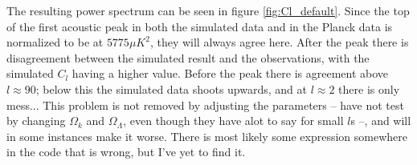 \documentclass[a4paper,norsk, 10pt]{article}
\begin{document}
The resulting power spectrum can be seen in figure \ref{fig:Cl_default}. Since the top of the first acoustic peak in both the simulated data and in the Planck data is normalized to be at $5775 \mu K^2$, they will always agree here. After the peak there is disagreement between the simulated result and the observations, with the simulated $C_l$ having a higher value. Before the peak there is agreement above $l \approx 90$; below this the simulated data shoots upwards, and at $l \approx 2$ there is only mess... This problem is not removed by adjusting the parameters -- have not test by changing $\Omega_k$ and $\Omega_{\Lambda}$, even though they have alot to say for small $l$s --, and will in some instances make it worse. There is most likely some expression somewhere in the code that is wrong, but I've yet to find it.
\end{document}
